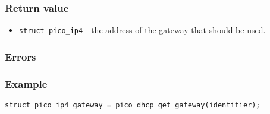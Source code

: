 \subsubsection*{Return value}
\begin{itemize}
\item \texttt{struct pico\_ip4} - the address of the gateway that should be used. 
\end{itemize}

\subsubsection*{Errors}

\subsubsection*{Example}
\begin{verbatim}
struct pico_ip4 gateway = pico_dhcp_get_gateway(identifier);
\end{verbatim}
